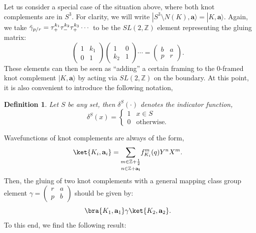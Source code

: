 \documentclass{article}
\newcommand{\Z}{{\mathbb Z}}
\def\be{\begin{equation}}
\def\ee{\end{equation}}
\newtheorem{definition}{Definition}
\numberwithin{corollary}{theorem}
\numberwithin{corollary}{proposition}
\begin{document}
Let us consider a special case of the situation above, where both knot complements are in $S^3$. For clarity, we will write $|S^3 \setminus N(K),\mathbf{a}\rangle = |K,\mathbf{a}\rangle $. Again, we take $\Tilde{\gamma}_{p/r} = \tau_+ ^{k_1}\tau_- ^{k_2}\tau_+ ^{k_3}\cdots $ to be the $SL(2,\mathbb{Z})$ element representing the gluing matrix:
\be
 \begin{pmatrix}
1 & k_1 \\
0 & 1 
\end{pmatrix} \begin{pmatrix}
1 & 0 \\
k_2 & 1  \end{pmatrix} \cdots = \begin{pmatrix}
b & a \\
p & r 
\end{pmatrix}.
\ee
These elements can then be seen as ``adding'' a certain framing to the 0-framed knot complement $|K,\mathbf{a}\rangle$ by acting via $SL(2,\mathbb{Z})$ on the boundary. At this point, it is also convenient to introduce the following notation, 
\begin{definition}
    Let $S$ be any set, then $\delta^S(\cdot)$ denotes the indicator function, 
    $$\delta^S(x)  = \begin{cases} 
       1 & x\in S\\
      0 & \text{otherwise.}
   \end{cases}$$
\end{definition}
Wavefunctions of knot complements are always of the form,
$$\ket{K_i,\mathbf{a}_i} = \underset{n\in \Z+\mathbf{a_i}}{\sum_{m\in \Z+\frac{1}{2}}} f^m_{K_i}(q)  Y^n X^m.$$
Then, the gluing of two knot complements with a general mapping class group element $\gamma = \begin{pmatrix}
    r&a\\
    p&b
\end{pmatrix}$ should be given by:
$$\bra{K_1,\mathbf{a}_1} \gamma \ket{K_2,\mathbf{a}_2}.$$
To this end, we find the following result:
\end{document}
